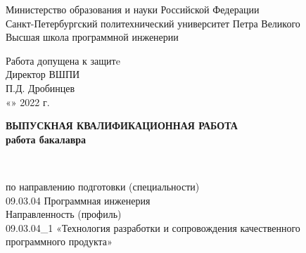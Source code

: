 \begin{titlepage}

  \begin{center} %




    Министерство образования и науки Российской Федерации\\Санкт-Петербургский политехнический университет Петра Великого\\
    Высшая школа программной инженерии\\[0.9cm]
    {
    \begin{flushright}
      Работа допущена к защитe\\
      Директор ВШПИ\\
      \underline{\hspace{2.2cm}} П.Д. Дробинцев\\
      «\underline{\hspace{0.8cm}}»\underline{\hspace{3cm}} 2022 г.\\[1.8cm]
    \end{flushright}
    }
    {\Large \bfseries ВЫПУСКНАЯ КВАЛИФИКАЦИОННАЯ РАБОТА}\\
    {\Large \bfseries работа бакалавра}\\[0.8cm]

    \bigskip
    \bigskip

    {\Large \bfseries \MakeUppercase{\Theme}}\\[0.4cm] %

    {
    \begin{flushleft}
      по направлению подготовки (специальности)\\
      09.03.04 Программная инженерия\\[0.2cm]
      Направленность (профиль)\\
      09.03.04\_1 «Технология разработки и сопровождения качественного программного продукта»\\[0.6cm]
    \end{flushleft}
    }


\end{center}
\end{titlepage}
